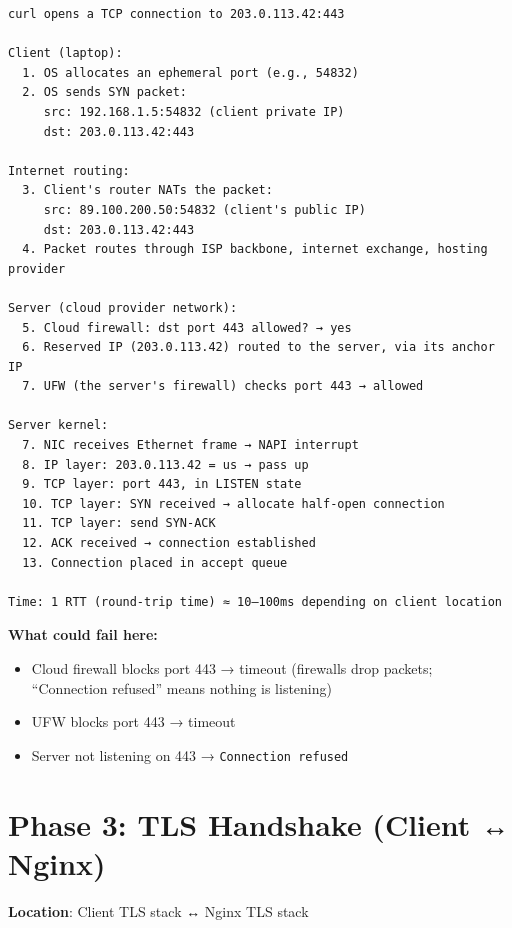 \begin{outputbox}
\begin{Verbatim}[fontsize=\codesize, breaklines, breakanywhere, breaksymbolleft={\tiny\textcolor{muted}{$\hookrightarrow$}}]
curl opens a TCP connection to 203.0.113.42:443

Client (laptop):
  1. OS allocates an ephemeral port (e.g., 54832)
  2. OS sends SYN packet:
     src: 192.168.1.5:54832 (client private IP)
     dst: 203.0.113.42:443

Internet routing:
  3. Client's router NATs the packet:
     src: 89.100.200.50:54832 (client's public IP)
     dst: 203.0.113.42:443
  4. Packet routes through ISP backbone, internet exchange, hosting provider

Server (cloud provider network):
  5. Cloud firewall: dst port 443 allowed? → yes
  6. Reserved IP (203.0.113.42) routed to the server, via its anchor IP
  7. UFW (the server's firewall) checks port 443 → allowed

Server kernel:
  7. NIC receives Ethernet frame → NAPI interrupt
  8. IP layer: 203.0.113.42 = us → pass up
  9. TCP layer: port 443, in LISTEN state
  10. TCP layer: SYN received → allocate half-open connection
  11. TCP layer: send SYN-ACK
  12. ACK received → connection established
  13. Connection placed in accept queue

Time: 1 RTT (round-trip time) ≈ 10–100ms depending on client location
\end{Verbatim}
\end{outputbox}

\noindent{}\textbf{What could fail here:}

\begin{itemize}
\tightlist
\item
  Cloud firewall blocks port 443 → timeout (firewalls drop packets; ``Connection refused'' means nothing is listening)
\item
  UFW blocks port 443 → timeout
\item
  Server not listening on 443 → \texttt{Connection\ refused}
\end{itemize}

\setcounter{section}{3}
\section{Phase 3: TLS Handshake (Client ↔ Nginx)}\label{29-client-server-journey:294-phase-3-tls-handshake-client--nginx}

\textbf{Location}: Client TLS stack ↔ Nginx TLS stack

